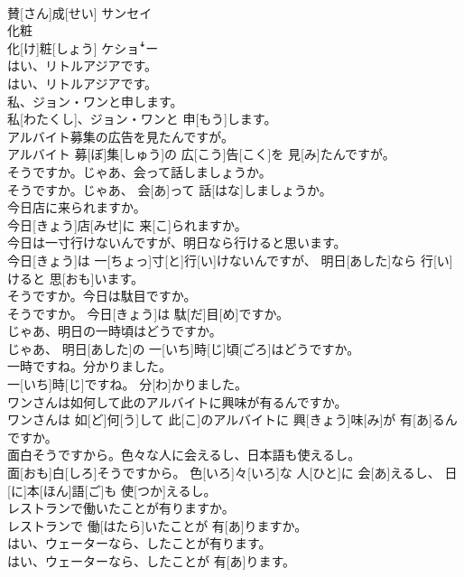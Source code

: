\documentclass[8pt]{extreport}
\begin{document}
\begin{CJK}{UTF8}{min}
\\	賛[さん]成[せい]	サンセイ
\\	化粧	
\\	化[け]粧[しょう]	ケショꜜー
\\	はい、リトルアジアです。	
\\	はい、リトルアジアです。
\\	私、ジョン・ワンと申します。	
\\	私[わたくし]、ジョン・ワンと 申[もう]します。
\\	アルバイト募集の広告を見たんですが。	
\\	アルバイト 募[ぼ]集[しゅう]の 広[こう]告[こく]を 見[み]たんですが。
\\	そうですか。じゃあ、会って話しましょうか。	
\\	そうですか。じゃあ、 会[あ]って 話[はな]しましょうか。
\\	今日店に来られますか。	
\\	今日[きょう]店[みせ]に 来[こ]られますか。
\\	今日は一寸行けないんですが、明日なら行けると思います。	
\\	今日[きょう]は 一[ちょっ]寸[と]行[い]けないんですが、 明日[あした]なら 行[い]けると 思[おも]います。
\\	そうですか。今日は駄目ですか。	
\\	そうですか。 今日[きょう]は 駄[だ]目[め]ですか。
\\	じゃあ、明日の一時頃はどうですか。	
\\	じゃあ、 明日[あした]の 一[いち]時[じ]頃[ごろ]はどうですか。
\\	一時ですね。分かりました。	
\\	一[いち]時[じ]ですね。 分[わ]かりました。
\\	ワンさんは如何して此のアルバイトに興味が有るんですか。	
\\	ワンさんは 如[ど]何[う]して 此[こ]のアルバイトに 興[きょう]味[み]が 有[あ]るんですか。
\\	面白そうですから。色々な人に会えるし、日本語も使えるし。	
\\	面[おも]白[しろ]そうですから。 色[いろ]々[いろ]な 人[ひと]に 会[あ]えるし、 日[に]本[ほん]語[ご]も 使[つか]えるし。
\\	レストランで働いたことが有りますか。	
\\	レストランで 働[はたら]いたことが 有[あ]りますか。
\\	はい、ウェーターなら、したことが有ります。	
\\	はい、ウェーターなら、したことが 有[あ]ります。

\end{CJK}
\end{document}
